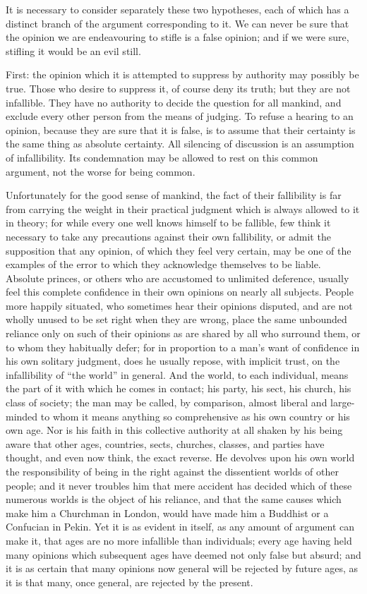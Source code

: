 \documentclass[11pt,openany]{book}
\begin{document}
It is necessary to consider separately these two hypotheses, each of which has a distinct branch of the argument corresponding to it. We can never be sure that the opinion we are endeavouring to stifle is a false opinion; and if we were sure, stifling it would be an evil still.

First: the opinion which it is attempted to suppress by authority may possibly be true. Those who desire to suppress it, of course deny its truth; but they are not infallible. They have no authority to decide the question for all mankind, and exclude every other person from the means of judging. To refuse a hearing to an opinion, because they are sure that it is false, is to assume that their certainty is the same thing as absolute certainty. All silencing of discussion is an assumption of infallibility. Its condemnation may be allowed to rest on this common argument, not the worse for being common.

Unfortunately for the good sense of mankind, the fact of their fallibility is far from carrying the weight in their practical judgment which is always allowed to it in theory; for while every one well knows himself to be fallible, few think it necessary to take any precautions against their own fallibility, or admit the supposition that any opinion, of which they feel very certain, may be one of the examples of the error to which they acknowledge themselves to be liable. Absolute princes, or others who are accustomed to unlimited deference, usually feel this complete confidence in their own opinions on nearly all subjects. People more happily situated, who sometimes hear their opinions disputed, and are not wholly unused to be set right when they are wrong, place the same unbounded reliance only on such of their opinions as are shared by all who surround them, or to whom they habitually defer; for in proportion to a man's want of confidence in his own solitary judgment, does he usually repose, with implicit trust, on the infallibility of ``the world'' in general. And the world, to each individual, means the part of it with which he comes in contact; his party, his sect, his church, his class of society; the man may be called, by comparison, almost liberal and large-minded to whom it means anything so comprehensive as his own country or his own age. Nor is his faith in this collective authority at all shaken by his being aware that other ages, countries, sects, churches, classes, and parties have thought, and even now think, the exact reverse. He devolves upon his own world the responsibility of being in the right against the dissentient worlds of other people; and it never troubles him that mere accident has decided which of these numerous worlds is the object of his reliance, and that the same causes which make him a Churchman in London, would have made him a Buddhist or a Confucian in Pekin. Yet it is as evident in itself, as any amount of argument can make it, that ages are no more infallible than individuals; every age having held many opinions which subsequent ages have deemed not only false but absurd; and it is as certain that many opinions now general will be rejected by future ages, as it is that many, once general, are rejected by the present.
\end{document}
